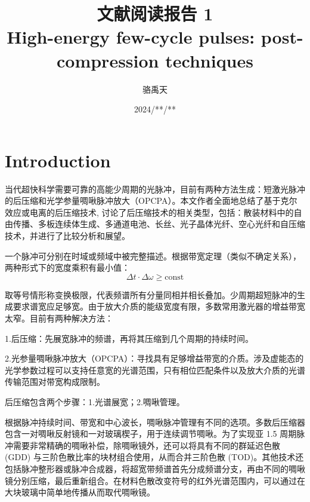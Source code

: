 \documentclass[14pt,a4paper,oneside]{article}
\title{\textbf{文献阅读报告 1}\\\textbf{High-energy few-cycle pulses: post-compression techniques}}                              %
\author{骆禹天}                                           %
\date{2024/**/**}                                        %
\numberwithin{equation}{subsection}             %
\numberwithin{figure}{subsection}               %
\begin{document}

\maketitle

\setcounter{page}{1}          %


\tableofcontents              %

\newpage                      
\setcounter{page}{1}          %









\section{Introduction}

当代超快科学需要可靠的高能少周期的光脉冲，目前有两种方法生成：短激光脉冲的后压缩和光学参量啁啾脉冲放大（OPCPA）。本文作者全面地总结了基于克尔效应或电离的后压缩技术, 讨论了后压缩技术的相关类型，包括：散装材料中的自由传播、多板连续体生成、多通道电池、长丝、光子晶体光纤、空心光纤和自压缩技术，并进行了比较分析和展望。

一个脉冲可分别在时域或频域中被完整描述。根据带宽定理（类似不确定关系），两种形式下的宽度乘积有最小值：
\begin{equation}
    \Delta t\cdot\Delta \omega\geq\mathrm{const}
    \label{eq:1.0.1}
\end{equation}

取等号情形称变换极限，代表频谱所有分量同相并相长叠加。少周期超短脉冲的生成要求谱宽应足够宽。由于放大介质的能级宽度有限，多数常用激光器的增益带宽太窄。目前有两种解决方法：

1.后压缩：先展宽脉冲的频谱，再将其压缩到几个周期的持续时间。

2.光参量啁啾脉冲放大（OPCPA）：寻找具有足够增益带宽的介质。涉及虚能态的光学参数过程可以支持任意宽的光谱范围，只有相位匹配条件以及放大介质的光谱传输范围对带宽构成限制。

后压缩包含两个步骤：1.光谱展宽；2.啁啾管理。

根据脉冲持续时间、带宽和中心波长，啁啾脉冲管理有不同的选项。多数后压缩器包含一对啁啾反射镜和一对玻璃楔子，用于连续调节啁啾。为了实现亚 1.5 周期脉冲需要非常精确的啁啾补偿，除啁啾镜外，还可以将具有不同的群延迟色散 (GDD) 与三阶色散比率的块材组合使用，从而合并三阶色散 (TOD)。其他技术还包括脉冲整形器或脉冲合成器，将超宽带频谱首先分成频谱分支，再由不同的啁啾镜分别压缩，最后重新组合。在材料色散改变符号的红外光谱范围内，可以通过在大块玻璃中简单地传播从而取代啁啾镜。
\end{document}

